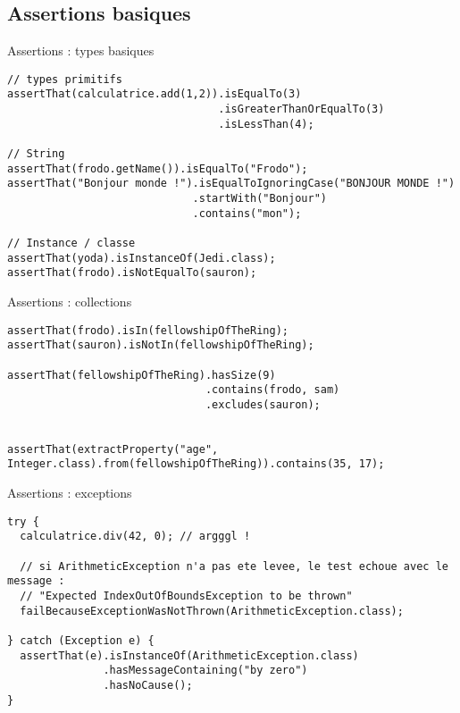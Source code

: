 \documentclass[compress]{beamer}%
\begin{document}
\subsection{Assertions basiques}

\begin{frame}[containsverbatim]{Assertions : types basiques}
	
	\begin{lstlisting}
// types primitifs
assertThat(calculatrice.add(1,2)).isEqualTo(3)
                                 .isGreaterThanOrEqualTo(3)
                                 .isLessThan(4);

// String
assertThat(frodo.getName()).isEqualTo("Frodo");
assertThat("Bonjour monde !").isEqualToIgnoringCase("BONJOUR MONDE !")
                             .startWith("Bonjour")
                             .contains("mon");

// Instance / classe
assertThat(yoda).isInstanceOf(Jedi.class);
assertThat(frodo).isNotEqualTo(sauron);
	\end{lstlisting}
\end{frame}


\begin{frame}[containsverbatim]{Assertions : collections}
	
	\begin{lstlisting}
assertThat(frodo).isIn(fellowshipOfTheRing);
assertThat(sauron).isNotIn(fellowshipOfTheRing);

assertThat(fellowshipOfTheRing).hasSize(9)
                               .contains(frodo, sam)
                               .excludes(sauron);
                               

assertThat(extractProperty("age", Integer.class).from(fellowshipOfTheRing)).contains(35, 17);
	\end{lstlisting}
\end{frame}


\begin{frame}[containsverbatim]{Assertions : exceptions}
	
	\begin{lstlisting}
try {
  calculatrice.div(42, 0); // argggl !
  
  // si ArithmeticException n'a pas ete levee, le test echoue avec le message : 
  // "Expected IndexOutOfBoundsException to be thrown"
  failBecauseExceptionWasNotThrown(ArithmeticException.class);
  
} catch (Exception e) {
  assertThat(e).isInstanceOf(ArithmeticException.class)
               .hasMessageContaining("by zero")
               .hasNoCause();
}
	\end{lstlisting}
\end{frame}
\end{document}

